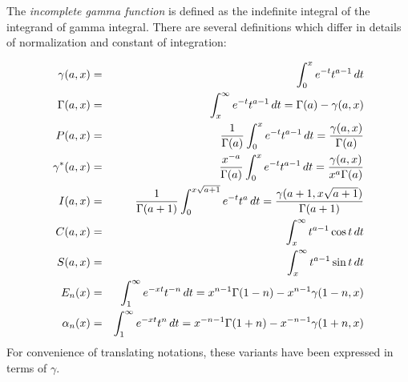 \documentclass[12pt]{article}
\begin{document}
The \emph{incomplete gamma function} is defined as the indefinite integral of the integrand of gamma integral.  There are several definitions which differ in details of normalization and constant of integration:

\begin{eqnarray*}
\gamma (a,x) &=& \int_0^x e^{-t} t^{a-1} \, dt \\
\Gamma (a,x) &=&  \int_x^\infty e^{-t} t^{a-1} \, dt = \Gamma(a) - \gamma (a,x) \\
P (a,x) &=& {1 \over \Gamma (a)} \int_0^x e^{-t} t^{a-1} \, dt = {\gamma (a,x) \over \Gamma(a)} \\
\gamma^* (a,x) &=& {x^{-a} \over \Gamma(a)} \int_0^x e^{-t} t^{a-1} \, dt = {\gamma (a,x) \over x^a \Gamma(a)} \\
I (a,x) &=&  {1 \over \Gamma (a+1)} \int_0^{x \sqrt{a+1}} e^{-t} t^a \, dt = {\gamma (a+1, x \sqrt{a+1}) \over  \Gamma(a+1)} \\
C (a,x) &=& \int_x^\infty t^{a-1} \cos t \, dt \\
S (a,x) &=& \int_x^\infty t^{a-1} \sin t \, dt \\
E_n (x) &=& \int_1^\infty e^{-xt} t^{-n} \, dt = x^{n-1} \Gamma (1-n) - x^{n-1} \gamma (1-n,x) \\
\alpha_n (x) &=& \int_1^\infty e^{-xt} t^n \, dt = x^{-n-1} \Gamma (1+n) - x^{-n-1} \gamma (1+n,x) \\
\end{eqnarray*}
For convenience of translating notations, these variants have been expressed in terms of $\gamma$.
\end{document}
